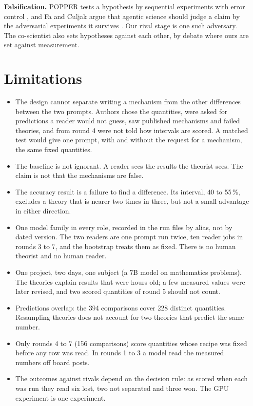 \documentclass[10pt]{article}
\begin{document}
\textbf{Falsification.} POPPER tests a hypothesis by sequential experiments with error control
\cite{huang2025popper}, and Fa and Culjak argue that agentic science should judge a claim by the adversarial
experiments it survives \cite{fa2026sound}. Our rival stage is one such adversary. The co-scientist
\cite{gottweis2025coscientist} also sets hypotheses against each other, by debate where ours are set against
measurement.

\section{Limitations}

\begin{itemize}
\item The design cannot separate writing a mechanism from the other differences between the two prompts. Authors
chose the quantities, were asked for predictions a reader would not guess, saw published mechanisms and failed
theories, and from round 4 were not told how intervals are scored. A matched test would give one prompt, with and without the
request for a mechanism, the same fixed quantities.
\item The baseline is not ignorant. A reader sees the results the theorist sees. The claim is not that the mechanisms are false.
\item The accuracy result is a failure to find a difference. Its interval, 40 to 55\,\%, excludes a theory that is
nearer two times in three, but not a small advantage in either direction.
\item One model family in every role, recorded in the run files by alias, not by dated version. The two readers
are one prompt run twice, ten reader jobs in rounds 3 to 7, and the bootstrap treats them as fixed. There is no
human theorist and no human reader.
\item One project, two days, one subject (a 7B model on mathematics problems). The theories explain results that
were hours old; a few measured values were later revised, and two scored quantities of round 5 should not count.
\item Predictions overlap: the 394 comparisons cover 228 distinct quantities. Resampling theories does not account for
two theories that predict the same number.
\item Only rounds 4 to 7 (156 comparisons) score quantities whose recipe was fixed before any row was read. In
rounds 1 to 3 a model read the measured numbers off board posts.
\item The outcomes against rivals depend on the decision rule: as scored when each was run they read six lost,
two not separated and three won. The GPU experiment is one experiment.
\end{itemize}
\end{document}
